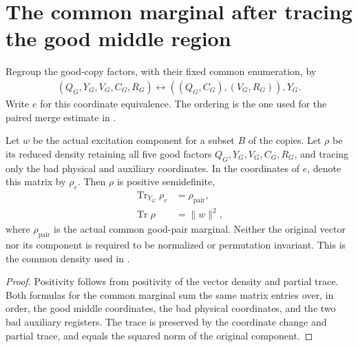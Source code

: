 \section{The common marginal after tracing the good middle region}
\label{sec:replica_good_configuration_pair_marginal}

\begin{definition}
\label{def:five_factor_pair_middle_equiv}
\leanok
Regroup the good-copy factors, with their fixed common enumeration, by
\begin{align*}
 (Q_G,Y_G,V_G,C_G,R_G)
 \longleftrightarrow ((Q_G,C_G),(V_G,R_G)),Y_G.
\end{align*}
Write $e$ for this coordinate equivalence. The ordering is the one used
for the paired merge estimate in
\cite[Section~8, lines~513--549]{OpenAI2026AreaLaw}.
\end{definition}

\begin{theorem}
\label{thm:replica_good_configuration_pair_marginal}
\leanok
{}
Let $w$ be the actual excitation component for a subset $B$ of the
copies. Let $\rho$ be its reduced density retaining all five good
factors $Q_G,Y_G,V_G,C_G,R_G$, and tracing only the bad physical and
auxiliary coordinates. In the coordinates of $e$, denote this matrix
by $\rho_e$. Then $\rho$ is positive semidefinite,
\begin{align*}
 \operatorname{Tr}_{Y_G}\rho_e&=\rho_{\mathrm{pair}},\\
 \operatorname{Tr}\rho&=\|w\|^2,
\end{align*}
where $\rho_{\mathrm{pair}}$ is the actual common good-pair marginal.
Neither the original vector nor its component is required to be
normalized or permutation invariant. This is the common density used
in \cite[Section~8, lines~513--549]{OpenAI2026AreaLaw}.
\end{theorem}
\begin{proof}
\leanok
{}
Positivity follows from positivity of the vector density and partial
trace. Both formulas for the common marginal sum the same matrix
entries over, in order, the good middle coordinates, the bad physical
coordinates, and the two bad auxiliary registers. The trace is preserved
by the coordinate change and partial trace, and equals the squared norm
of the original component.
\end{proof}

